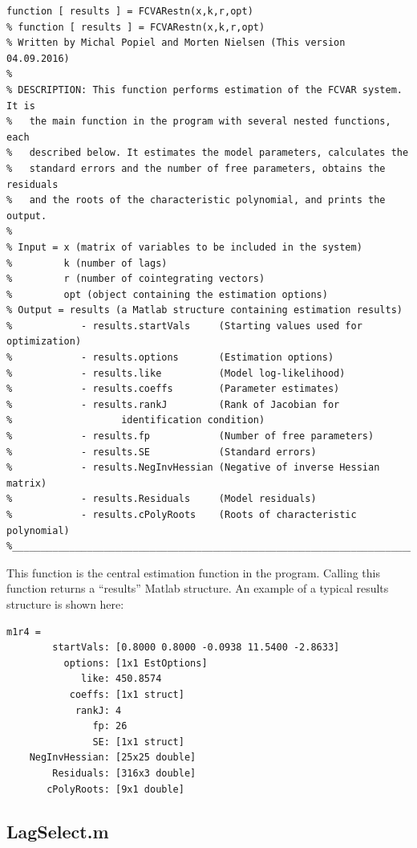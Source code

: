 \documentclass[10pt]{article}
\begin{document}
\begin{lstlisting}[frame=single,caption={FCVARestn.m}, label = FCVARestn]
function [ results ] = FCVARestn(x,k,r,opt)
% function [ results ] = FCVARestn(x,k,r,opt)
% Written by Michal Popiel and Morten Nielsen (This version 04.09.2016)
% 
% DESCRIPTION: This function performs estimation of the FCVAR system. It is
% 	the main function in the program with several nested functions, each
% 	described below. It estimates the model parameters, calculates the
% 	standard errors and the number of free parameters, obtains the residuals
% 	and the roots of the characteristic polynomial, and prints the output.
%
% Input = x (matrix of variables to be included in the system)
%         k (number of lags)
%         r (number of cointegrating vectors)
%         opt (object containing the estimation options)
% Output = results (a Matlab structure containing estimation results)
%            - results.startVals     (Starting values used for optimization)
%            - results.options       (Estimation options)
%            - results.like          (Model log-likelihood)
%            - results.coeffs        (Parameter estimates)
%            - results.rankJ         (Rank of Jacobian for 
%					identification condition)
%            - results.fp            (Number of free parameters)
%            - results.SE            (Standard errors)
%            - results.NegInvHessian (Negative of inverse Hessian matrix)
%            - results.Residuals     (Model residuals)
%            - results.cPolyRoots    (Roots of characteristic polynomial)
%_________________________________________________________________________
\end{lstlisting}

This function is the central estimation function in the program. Calling this function returns a ``results'' Matlab structure. An example of a typical results structure is shown here:
\begin{verbatim}
m1r4 = 
        startVals: [0.8000 0.8000 -0.0938 11.5400 -2.8633]
          options: [1x1 EstOptions]
             like: 450.8574
           coeffs: [1x1 struct]
            rankJ: 4
               fp: 26
               SE: [1x1 struct]
    NegInvHessian: [25x25 double]
        Residuals: [316x3 double]
       cPolyRoots: [9x1 double]
\end{verbatim}


\subsection{LagSelect.m}
\end{document}
